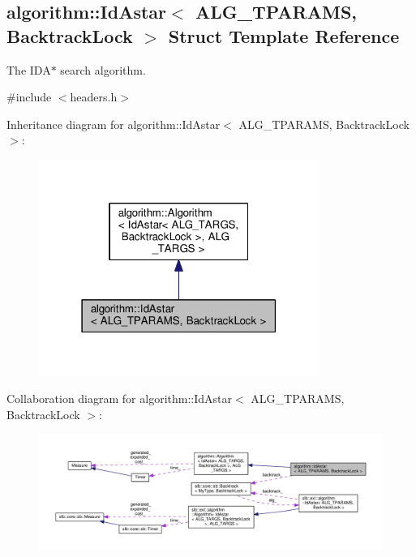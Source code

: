 \hypertarget{structalgorithm_1_1IdAstar}{}\subsection{algorithm\+:\+:Id\+Astar$<$ A\+L\+G\+\_\+\+T\+P\+A\+R\+A\+MS, Backtrack\+Lock $>$ Struct Template Reference}
\label{structalgorithm_1_1IdAstar}


The {\ttfamily I\+D\+A$\ast$} search algorithm.  




{\ttfamily \#include $<$headers.\+h$>$}



Inheritance diagram for algorithm\+:\+:Id\+Astar$<$ A\+L\+G\+\_\+\+T\+P\+A\+R\+A\+MS, Backtrack\+Lock $>$\+:\nopagebreak
\begin{figure}[H]
\begin{center}
\leavevmode
\includegraphics[width=259pt]{structalgorithm_1_1IdAstar__inherit__graph}
\end{center}
\end{figure}


Collaboration diagram for algorithm\+:\+:Id\+Astar$<$ A\+L\+G\+\_\+\+T\+P\+A\+R\+A\+MS, Backtrack\+Lock $>$\+:
\nopagebreak
\begin{figure}[H]
\begin{center}
\leavevmode
\includegraphics[width=350pt]{structalgorithm_1_1IdAstar__coll__graph}
\end{center}
\end{figure}
